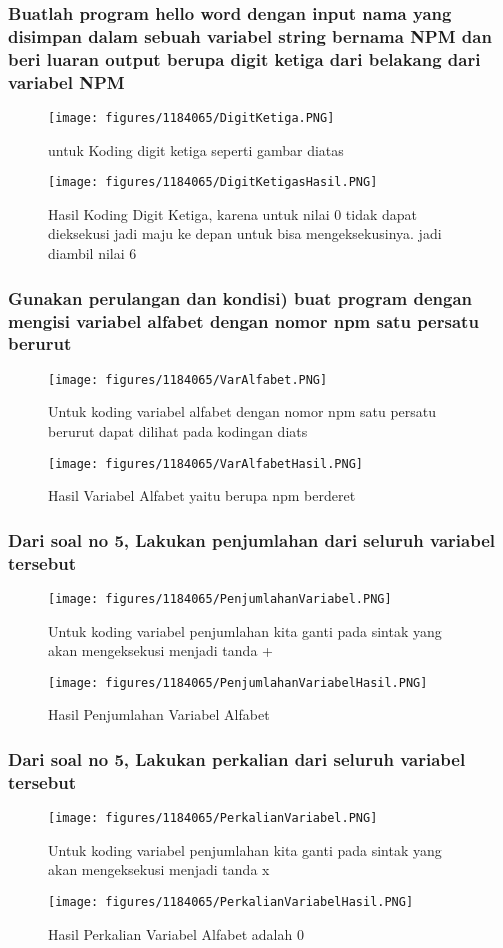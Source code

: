 \subsubsection{Buatlah program hello word dengan input nama yang disimpan dalam sebuah variabel string bernama \textbf{NPM} dan beri luaran output berupa digit ketiga dari belakang dari variabel NPM}
\begin{figure}[H]
		\texttt{[image: figures/1184065/DigitKetiga.PNG]}
		\centering
		\caption{untuk Koding digit ketiga seperti gambar diatas}
\end{figure}
\begin{figure}[H]
		\texttt{[image: figures/1184065/DigitKetigasHasil.PNG]}
		\centering
		\caption{Hasil Koding Digit Ketiga, karena untuk nilai 0 tidak dapat dieksekusi jadi maju ke depan untuk bisa mengeksekusinya. jadi diambil nilai 6}
\end{figure}
\subsubsection{Gunakan perulangan dan kondisi) buat program dengan mengisi variabel alfabet dengan nomor npm satu persatu berurut}
\begin{figure}[H]
		\texttt{[image: figures/1184065/VarAlfabet.PNG]}
		\centering
		\caption{Untuk koding variabel alfabet dengan nomor npm satu persatu berurut dapat dilihat pada kodingan diats}
\end{figure}
\begin{figure}[H]
		\texttt{[image: figures/1184065/VarAlfabetHasil.PNG]}
		\centering
		\caption{Hasil Variabel Alfabet yaitu berupa npm berderet}
\end{figure}
\subsubsection{Dari soal no 5, Lakukan penjumlahan dari seluruh variabel tersebut}
\begin{figure}[H]
		\texttt{[image: figures/1184065/PenjumlahanVariabel.PNG]}
		\centering
		\caption{Untuk koding variabel penjumlahan kita ganti pada sintak yang akan mengeksekusi menjadi tanda +}
\end{figure}
\begin{figure}[H]
		\texttt{[image: figures/1184065/PenjumlahanVariabelHasil.PNG]}
		\centering
		\caption{Hasil Penjumlahan Variabel Alfabet}
\end{figure}
\subsubsection{Dari soal no 5, Lakukan perkalian dari seluruh variabel tersebut}
\begin{figure}[H]
		\texttt{[image: figures/1184065/PerkalianVariabel.PNG]}
		\centering
		\caption{Untuk koding variabel penjumlahan kita ganti pada sintak yang akan mengeksekusi menjadi tanda x}
\end{figure}
\begin{figure}[H]
		\texttt{[image: figures/1184065/PerkalianVariabelHasil.PNG]}
		\centering
		\caption{Hasil Perkalian Variabel Alfabet adalah 0}
\end{figure}
